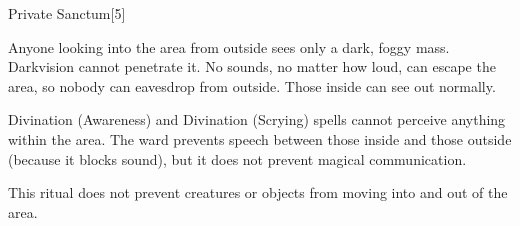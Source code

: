 \begin{spellsection}{Private Sanctum}[5]
    \begin{spellheader}
    \end{spellheader}
    \begin{spellcontent}
        \begin{spelltargetinginfo}
        \end{spelltargetinginfo}
        \begin{spelleffects}
            \spelleffect Anyone looking into the area from outside sees only a dark, foggy mass. Darkvision cannot penetrate it. No sounds, no matter how loud, can escape the area, so nobody can eavesdrop from outside. Those inside can see out normally.

            Divination (Awareness) and Divination (Scrying) spells cannot perceive anything within the area. The ward prevents speech between those inside and those outside (because it blocks sound), but it does not prevent magical communication.
            \spelldur \durext \dismissable
        \end{spelleffects}
    \end{spellcontent}
    \begin{spellfooter}
        \spellnotes This ritual does not prevent creatures or objects from moving into and out of the area.
    \end{spellfooter}
    \begin{spellaugments}
    \end{spellaugments}
\end{spellsection}

